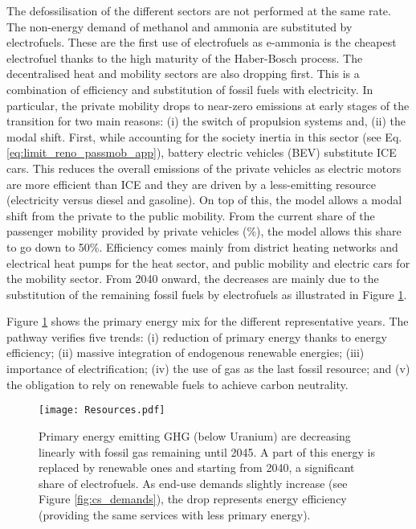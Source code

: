 The defossilisation of the different sectors are not performed at the same rate. The non-energy demand of methanol and ammonia are substituted by electrofuels. These are the first use of electrofuels as  e-ammonia is the cheapest electrofuel thanks to the high maturity of the Haber-Bosch process. The decentralised heat and mobility sectors are also dropping first. This is a combination of efficiency and substitution of fossil fuels with electricity. In particular, the private mobility drops to near-zero emissions at early stages of the transition for two main reasons: (i) the switch of propulsion systems and, (ii) the modal shift. First, while accounting for the society inertia in this sector (see Eq. \ref{eq:limit_reno_passmob_app}), battery electric vehicles (BEV) substitute \gls{ICE} cars. This reduces the overall emissions of the private vehicles as electric motors are more efficient than \gls{ICE} and they are driven by a less-emitting resource (\ie electricity versus diesel and gasoline). On top of this, the model allows a modal shift from the private to the public mobility. From the current share of the passenger mobility provided by private vehicles (\%), the model allows this share to go down to 50\%. Efficiency comes mainly from district heating networks and electrical heat pumps for the heat sector, and public mobility and electric cars for the mobility sector. From 2040 onward, the decreases are mainly due to the substitution of the remaining fossil fuels by electrofuels as illustrated in Figure \ref{fig:pestd_primary_energy}.

Figure \ref{fig:pestd_primary_energy} shows the primary energy mix for the different representative years. The pathway verifies five trends: (i) reduction of primary energy thanks to energy efficiency; (ii) massive integration of endogenous renewable energies; (iii) importance of electrification; (iv) the use of gas as the last fossil resource; and (v) the obligation to rely on renewable fuels to achieve carbon neutrality.

 \begin{figure}[!htbp]
\centering
\texttt{[image: Resources.pdf]}
\caption{Primary energy emitting \gls{GHG} (below Uranium) are decreasing linearly with fossil gas remaining until 2045. A part of this energy is replaced by renewable ones and starting from 2040, a significant share of electrofuels. As end-use demands slightly increase (see Figure \ref{fig:cs_demands}), the drop represents energy efficiency (\ie providing the same services with less primary energy).}
\label{fig:pestd_primary_energy}
\end{figure}

